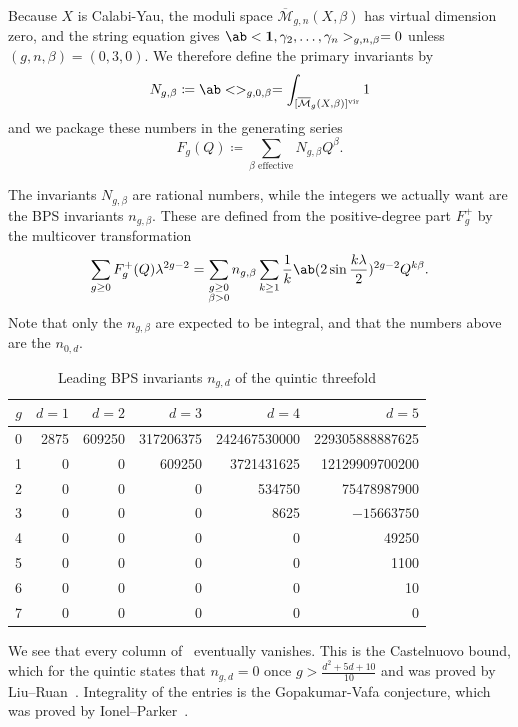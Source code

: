 \documentclass{amsart}
\theoremstyle{definition}
\theoremstyle{remark}
\theoremstyle{plain}
\theoremstyle{definition}
\theoremstyle{remark}
\newcommand{\Mbar}{\overline{\mathcal{M}}}
\newcommand{\mr}[1]{\mathrm{#1}}
\newcommand{\1}{\mathbf{1}}
\newcommand{\2}{\mathbf{2}}
\newcommand{\3}{\mathbf{3}}
\newcommand{\vir}{\mr{vir}}
\begin{document}
Because \(X\) is Calabi-Yau, the moduli space \(\Mbar_{g,n}(X,\beta)\) has virtual dimension zero, and the string equation gives \(\ab<\1, \gamma_2, \ldots, \gamma_n>_{g,n,\beta} = 0\) unless \((g,n,\beta) = (0,3,0)\). We therefore define the primary invariants by
\[ N_{g,\beta} \coloneqq \ab<>_{g,0,\beta} = \int_{[\Mbar_g(X,\beta)]^{\vir}} 1 \]
and we package these numbers in the generating series
\[ F_g(Q) \coloneqq \sum_{\beta \text{ effective}} N_{g,\beta}Q^{\beta}. \]

The invariants \(N_{g,\beta}\) are rational numbers, while the integers we actually want are the BPS invariants \(n_{g,\beta}\). These are defined from the positive-degree part \(F_g^+\) by the multicover transformation
\[ \sum_{g \geq 0} F_g^+(Q)\lambda^{2g-2} = \sum_{\substack{g \geq 0 \\ \beta > 0}} n_{g,\beta} \sum_{k \geq 1} \frac{1}{k} \ab(2 \sin \frac{k\lambda}{2})^{2g-2}Q^{k\beta}. \]
Note that only the \(n_{g,\beta}\) are expected to be integral, and that the numbers above are the \(n_{0,d}\).

\begin{table}[htpb]
    \centering
    \caption{Leading BPS invariants \(n_{g,d}\) of the quintic threefold}
    \label{tab:quinticbps}
    \begin{tabular}{crrrrr}
        \toprule
        \(g\) & \(d=1\) & \(d=2\) & \(d=3\) & \(d=4\) & \(d=5\) \\
        \midrule
        0 & 2875 & 609250 & 317206375 & 242467530000 & 229305888887625 \\
        1 & 0 & 0 & 609250 & 3721431625 & 12129909700200 \\
        2 & 0 & 0 & 0 & 534750 & 75478987900 \\
        3 & 0 & 0 & 0 & 8625 & \(-15663750\) \\
        4 & 0 & 0 & 0 & 0 & 49250 \\
        5 & 0 & 0 & 0 & 0 & 1100 \\
        6 & 0 & 0 & 0 & 0 & 10 \\
        7 & 0 & 0 & 0 & 0 & 0 \\
        \bottomrule
    \end{tabular}
\end{table}

We see that every column of~ eventually vanishes. This is the Castelnuovo bound, which for the quintic states that \(n_{g,d} = 0\) once \(g > \frac{d^2+5d+10}{10}\) and was proved by Liu--Ruan~\cite{LiuRuanCastelnuovo}. Integrality of the entries is the Gopakumar-Vafa conjecture, which was proved by Ionel--Parker~\cite{IonelParker2018}.
\end{document}
